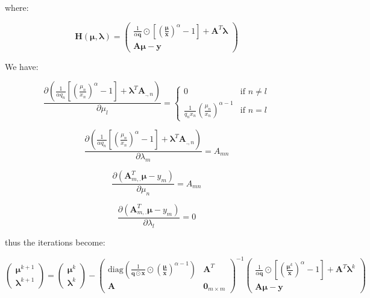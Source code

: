 \documentclass{tex/note}
\begin{document}
where:

\begin{equation*}
\bm{H} \left( \bm{\mu} , \bm{\lambda} \right) = \begin{pmatrix} \frac{1}{\alpha \bm{q}} \odot \left[ \left( \frac{\bm{\mu}}{\bm{x}} \right)^{\alpha} - 1 \right] + \bm{A}^T \bm{\lambda} \\ \bm{A} \bm{\mu} - \bm{y} \end{pmatrix}
\end{equation*}

We have:

\begin{equation*}
\frac{\partial \left( \frac{1}{\alpha q_n} \left[ \left( \frac{\mu_n}{x_n} \right) ^{\alpha} - 1\right] + \bm{\lambda}^T \bm{A}_{.,n} \right)}{\partial \mu_l} =
\begin{cases}
0 & \text{if } n \neq l \\
\frac{1}{q_n x_n} \left( \frac{\mu_n}{x_n} \right)^{\alpha - 1} & \text{if } n = l
\end{cases}
\end{equation*}

\begin{equation*}
\frac{\partial \left( \frac{1}{\alpha q_n} \left[ \left( \frac{\mu_n}{x_n} \right) ^{\alpha} - 1\right] + \bm{\lambda}^T \bm{A}_{.,n} \right)}{\partial \lambda_m} = A_{mn}
\end{equation*}

\begin{equation*}
\frac{\partial \left( \bm{A}_{m,.}^T \bm{\mu} - y_m \right)}{\partial \mu_n} = A_{mn}
\end{equation*}

\begin{equation*}
\frac{\partial \left( \bm{A}_{m,.}^T \bm{\mu} - y_m \right)}{\partial \lambda_l} = 0
\end{equation*}

thus the iterations become:

\begin{equation*}
\begin{pmatrix} \bm{\mu}^{k + 1} \\ \bm{\lambda}^{k + 1} \end{pmatrix} = \begin{pmatrix} \bm{\mu}^k \\ \bm{\lambda}^k \end{pmatrix} - \begin{pmatrix} \text{diag} \left( \frac{1}{\bm{q} \odot \bm{x}} \odot \left( \frac{\bm{\mu}}{\bm{x}} \right)^{\alpha - 1} \right)  & \bm{A}^T \\ \bm{A} & \bm{0}_{m \times m} \end{pmatrix} ^{-1} \begin{pmatrix} \frac{1}{\alpha \bm{q}} \odot \left[ \left( \frac{\bm{\mu}^k}{\bm{x}} \right)^{\alpha} - 1\right] + \bm{A}^T \bm{\lambda}^k \\ \bm{A} \bm{\mu} - \bm{y} \end{pmatrix}
\end{equation*}
\end{document}
